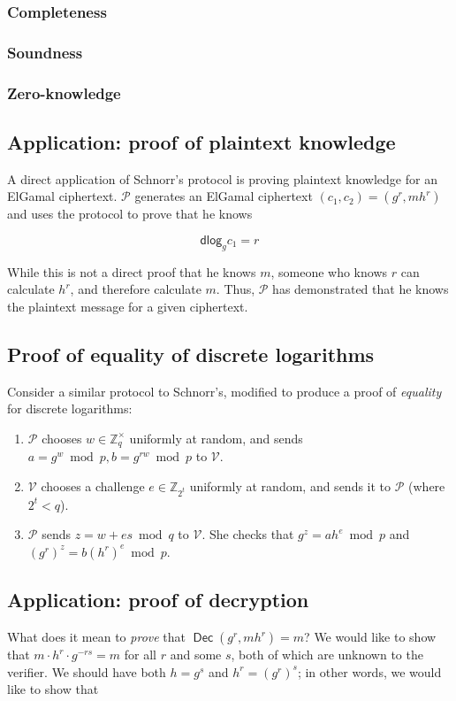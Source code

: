 \documentclass[11pt,twoside,a4paper]{article}
\DeclareMathOperator{\Dec}{\mathsf{Dec}}
\newcommand{\dlog}{\mathsf{dlog}}
\theoremstyle{definition}
\begin{document}
\subsubsection{Completeness}
\subsubsection{Soundness}
\subsubsection{Zero-knowledge}
\subsection{Application: proof of plaintext knowledge}
A direct application of Schnorr's protocol is proving plaintext knowledge for an ElGamal ciphertext. \(\mathcal{P}\) generates an ElGamal ciphertext \((c_1, c_2)=(g^r, mh^r)\) and uses the protocol to prove that he knows

\[\dlog_g{c_1}=r\]

While this is not a direct proof that he knows \(m\), someone who knows \(r\) can calculate \(h^r\), and therefore calculate \(m\). Thus, \(\mathcal{P}\) has demonstrated that he knows the plaintext message for a given ciphertext.

\subsection{Proof of equality of discrete logarithms}
Consider a similar protocol to Schnorr's, modified to produce a proof of \textit{equality} for discrete logarithms:
\begin{enumerate}
    \item \(\mathcal{P}\) chooses \(w\in\mathbb{Z}^\times_q\) uniformly at random, and sends \(a=g^w\bmod p,b=g^{rw}\bmod p\) to \(\mathcal{V}\).
    \item \(\mathcal{V}\) chooses a challenge \(e\in\mathbb{Z}_{2^t}\) uniformly at random, and sends it to \(\mathcal{P}\) (where \(2^t<q\)).
    \item \(\mathcal{P}\) sends \(z=w+es\bmod q\) to \(\mathcal{V}\). She checks that \(g^z=ah^e\bmod p\) and \((g^r)^z=b(h^r)^e\bmod p\).
\end{enumerate}

\subsection{Application: proof of decryption}
What does it mean to \textit{prove} that \(\Dec(g^r,mh^r)=m\)? We would like to show that \(m\cdot h^r\cdot g^{-rs}=m\) for all \(r\) and some \(s\), both of which are unknown to the verifier. We should have both \(h=g^s\) and \(h^r=(g^r)^s\); in other words, we would like to show that
\end{document}
